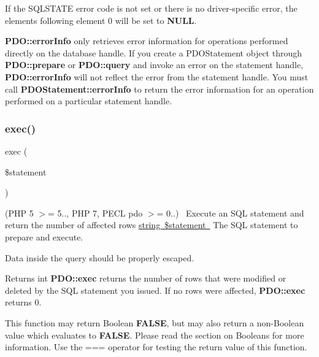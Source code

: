 If the S\+Q\+L\+S\+T\+A\+TE error code is not set or there is no driver-\/specific error, the elements following element 0 will be set to {\bfseries N\+U\+LL}. 

{\bfseries P\+D\+O\+::error\+Info} only retrieves error information for operations performed directly on the database handle. If you create a P\+D\+O\+Statement object through {\bfseries P\+D\+O\+::prepare} or {\bfseries P\+D\+O\+::query} and invoke an error on the statement handle, {\bfseries P\+D\+O\+::error\+Info} will not reflect the error from the statement handle. You must call {\bfseries P\+D\+O\+Statement\+::error\+Info} to return the error information for an operation performed on a particular statement handle. \mbox{\label{interface_pes_1_1_database_1_1_handler_1_1_mini_1_1_p_d_o_interface_aa14a8f8ef2c7ed2b8985d28b336941c9}} 
\subsubsection{\texorpdfstring{exec()}{exec()}}
{\footnotesize\ttfamily exec (\begin{DoxyParamCaption}\item[{}]{\$statement }\end{DoxyParamCaption})}

(P\+HP 5 $>$= 5.., P\+HP 7, P\+E\+CL pdo $>$= 0..)~\newline
 Execute an S\+QL statement and return the number of affected rows \mbox{\hyperlink{}{string \$statement }} The S\+QL statement to prepare and execute. 

Data inside the query should be properly escaped. 

\begin{DoxyReturn}{Returns}
int {\bfseries P\+D\+O\+::exec} returns the number of rows that were modified or deleted by the S\+QL statement you issued. If no rows were affected, {\bfseries P\+D\+O\+::exec} returns 0. 
\end{DoxyReturn}
This function may return Boolean {\bfseries F\+A\+L\+SE}, but may also return a non-\/\+Boolean value which evaluates to {\bfseries F\+A\+L\+SE}. Please read the section on Booleans for more information. Use the === operator for testing the return value of this function. 


